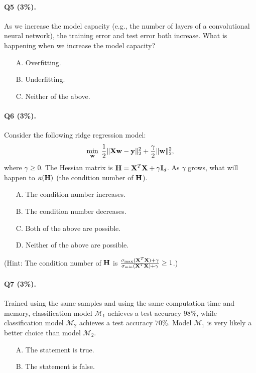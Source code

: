 \documentclass[11pt]{article}
\numberwithin{equation}{section}
\def\H{{\bf H}}
\def\I{{\bf I}}
\def\w{{\bf w}}
\def\X{{\bf X}}
\def\y{{\bf y}}
\begin{document}
\paragraph{Q5 (3\%).} 
As we increase the model capacity (e.g., the number of layers of a convolutional neural network),
the training error and test error both increase.
What is happening when we increase the model capacity?
\begin{itemize}
	\item[A.] Overfitting.
	\item[B.] Underfitting.
	\item[C.] Neither of the above.
\end{itemize}



\paragraph{Q6 (3\%).} 
Consider the following ridge regression model:
\begin{equation*}
\min_{\w} \; \frac{1}{2}\| \X \w - \y \|_2^2  + \frac{\gamma}{2} \| \w \|_2^2 ,
\end{equation*}
where $\gamma \geq 0$.
The Hessian matrix is $\H = \X^T \X + \gamma \I_d$.
As $\gamma$ grows, what will happen to $\kappa (\H)$ (the condition number of $\H$).
\begin{itemize}
	\item[A.]
	The condition number increases.
	\item[B.]
	The condition number decreases.
	\item[C.]
	Both of the above are possible.
	\item[D.]
	Neither of the above are possible.
\end{itemize}
(Hint: The condition number of $\H$ is $\frac{ \sigma_{\max} (\X^T \X) + \gamma }{ \sigma_{\min} (\X^T \X) + \gamma } \geq 1$.)





\paragraph{Q7 (3\%).} 
Trained using the same samples and using the same computation time and memory,
classification model $\mathcal{M}_1$ achieves a test accuracy $98\%$,
while classification model $\mathcal{M}_2$ achieves a test accuracy $70\%$.
Model $\mathcal{M}_1$ is very likely a better choice than model $\mathcal{M}_2$.
\begin{itemize}
	\item[A.]
	The statement is true.
	\item[B.]
	The statement is false.
\end{itemize}
\end{document}
